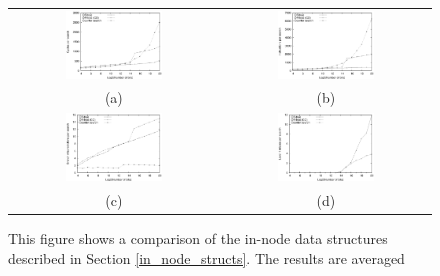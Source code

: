 \documentclass[]{acmtrans2m}
\begin{document}
\begin{figure}%
\center
\begin{tabular}{cc}
\includegraphics[width=0.485\textwidth]{plots/nstructs_cyc.eps} & \includegraphics[width=0.485\textwidth]{plots/nstructs_ins.eps}\\
(a) & (b)\\
\includegraphics[width=0.485\textwidth]{plots/nstructs_brmsp.eps} & \includegraphics[width=0.485\textwidth]{plots/nstructs_l1dcm.eps}\\
(c) & (d)\\
\end{tabular}
\caption{This figure shows a comparison of the in-node data structures described in Section \ref{in_node_structs}. The results are averaged
}
\end{figure}
\end{document}
